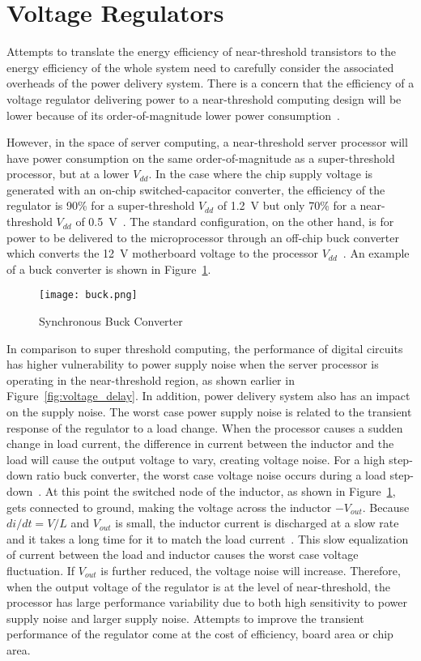 \section{Voltage Regulators}
\label{sec:regulators}

Attempts to translate the energy efficiency of near-threshold transistors to the energy efficiency of the whole system need to carefully consider the associated overheads of the power delivery system.
There is a concern that the efficiency of a voltage regulator delivering power to a near-threshold computing design will be lower because of its order-of-magnitude lower power consumption~\cite{ISLPED:2011}.

However, in the space of server computing, a near-threshold server processor will have power consumption on the same order-of-magnitude as a super-threshold processor, but at a lower $V_{dd}$.
In the case where the chip supply voltage is generated with an on-chip switched-capacitor converter, the efficiency of the regulator is 90\% for a super-threshold $V_{dd}$ of \SI{1.2}{\volt} but only 70\% for a near-threshold $V_{dd}$ of \SI{0.5}{\volt}~\cite{Pitfall:2010}.
The standard configuration, on the other hand, is for power to be delivered to the microprocessor through an off-chip buck converter which converts the \SI{12}{\volt} motherboard voltage to the processor $V_{dd}$~\cite{Server:2006}.
An example of a buck converter is shown in Figure~\ref{fig:buck}.

\begin{figure}[thpb]
\centering
\texttt{[image: buck.png]}
\label{fig:buck}
\caption{Synchronous Buck Converter}
\end{figure}

In comparison to super threshold computing, the performance of digital circuits has higher vulnerability to power supply noise when the server processor is operating in the near-threshold region, as shown earlier in Figure~\ref{fig:voltage_delay}. In addition, power delivery system also has an impact on the supply noise.
The worst case power supply noise is related to the transient response of the regulator to a load change.
When the processor causes a sudden change in load current, the difference in current between the inductor and the load will cause the output voltage to vary, creating voltage noise.
For a high step-down ratio buck converter, the worst case voltage noise occurs during a load step-down~\cite{Transient}.
At this point the switched node of the inductor, as shown in Figure~\ref{fig:buck}, gets connected to ground, making the voltage across the inductor $-V_{out}$.
Because $di/dt=V/L$ and $V_{out}$ is small, the inductor current is discharged at a slow rate and it takes a long time for it to match the load current~\cite{g2010principles}.
This slow equalization of current between the load and inductor causes the worst case voltage fluctuation.
If $V_{out}$ is further reduced, the voltage noise will increase.
Therefore, when the output voltage of the regulator is at the level of near-threshold, the processor has large performance variability due to both high sensitivity to power supply noise and larger supply noise.
Attempts to improve the transient performance of the regulator come at the cost of efficiency, board area or chip area.



